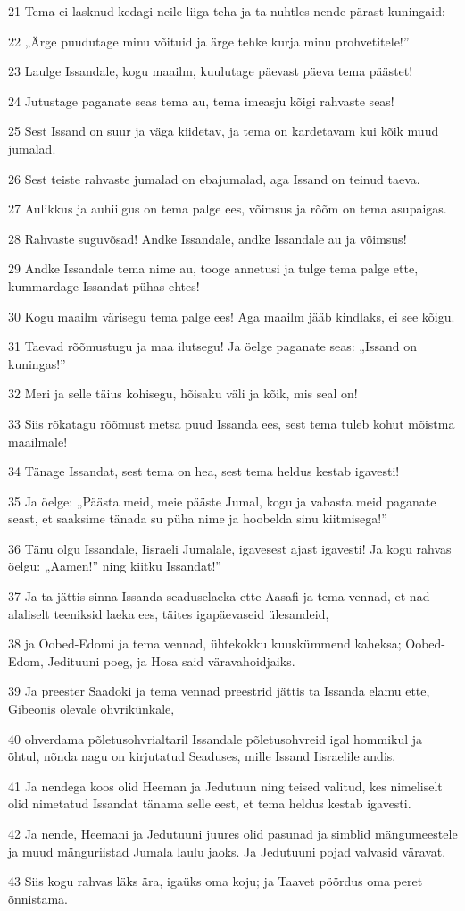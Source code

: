 \par 21 Tema ei lasknud kedagi neile liiga teha ja ta nuhtles nende pärast kuningaid:
\par 22 „Ärge puudutage minu võituid ja ärge tehke kurja minu prohvetitele!”
\par 23 Laulge Issandale, kogu maailm, kuulutage päevast päeva tema päästet!
\par 24 Jutustage paganate seas tema au, tema imeasju kõigi rahvaste seas!
\par 25 Sest Issand on suur ja väga kiidetav, ja tema on kardetavam kui kõik muud jumalad.
\par 26 Sest teiste rahvaste jumalad on ebajumalad, aga Issand on teinud taeva.
\par 27 Aulikkus ja auhiilgus on tema palge ees, võimsus ja rõõm on tema asupaigas.
\par 28 Rahvaste suguvõsad! Andke Issandale, andke Issandale au ja võimsus!
\par 29 Andke Issandale tema nime au, tooge annetusi ja tulge tema palge ette, kummardage Issandat pühas ehtes!
\par 30 Kogu maailm värisegu tema palge ees! Aga maailm jääb kindlaks, ei see kõigu.
\par 31 Taevad rõõmustugu ja maa ilutsegu! Ja öelge paganate seas: „Issand on kuningas!”
\par 32 Meri ja selle täius kohisegu, hõisaku väli ja kõik, mis seal on!
\par 33 Siis rõkatagu rõõmust metsa puud Issanda ees, sest tema tuleb kohut mõistma maailmale!
\par 34 Tänage Issandat, sest tema on hea, sest tema heldus kestab igavesti!
\par 35 Ja öelge: „Päästa meid, meie pääste Jumal, kogu ja vabasta meid paganate seast, et saaksime tänada su püha nime ja hoobelda sinu kiitmisega!”
\par 36 Tänu olgu Issandale, Iisraeli Jumalale, igavesest ajast igavesti! Ja kogu rahvas öelgu: „Aamen!” ning kiitku Issandat!”
\par 37 Ja ta jättis sinna Issanda seaduselaeka ette Aasafi ja tema vennad, et nad alaliselt teeniksid laeka ees, täites igapäevaseid ülesandeid,
\par 38 ja Oobed-Edomi ja tema vennad, ühtekokku kuuskümmend kaheksa; Oobed-Edom, Jedituuni poeg, ja Hosa said väravahoidjaiks.
\par 39 Ja preester Saadoki ja tema vennad preestrid jättis ta Issanda elamu ette, Gibeonis olevale ohvrikünkale,
\par 40 ohverdama põletusohvrialtaril Issandale põletusohvreid igal hommikul ja õhtul, nõnda nagu on kirjutatud Seaduses, mille Issand Iisraelile andis.
\par 41 Ja nendega koos olid Heeman ja Jedutuun ning teised valitud, kes nimeliselt olid nimetatud Issandat tänama selle eest, et tema heldus kestab igavesti.
\par 42 Ja nende, Heemani ja Jedutuuni juures olid pasunad ja simblid mängumeestele ja muud mänguriistad Jumala laulu jaoks. Ja Jedutuuni pojad valvasid väravat.
\par 43 Siis kogu rahvas läks ära, igaüks oma koju; ja Taavet pöördus oma peret õnnistama.

